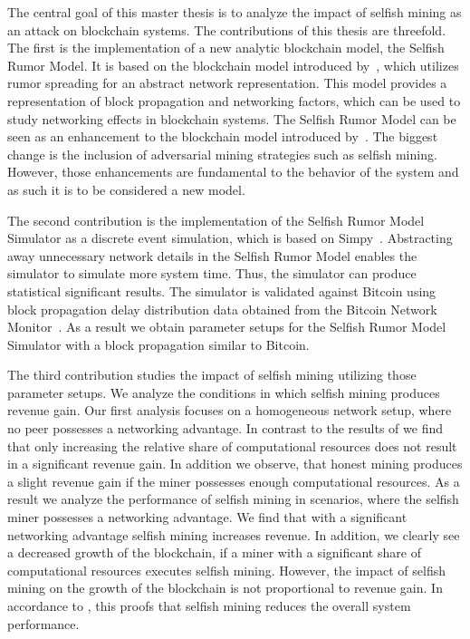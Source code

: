 The central goal of this master thesis is to analyze the impact of selfish mining as an attack on blockchain systems. The contributions of this thesis are threefold. The first is the implementation of a new analytic blockchain model, the Selfish Rumor Model. It is based on the blockchain model introduced by~, which utilizes rumor spreading for an abstract network representation. This model provides a representation of block propagation and networking factors, which can be used to study networking effects in blockchain systems. The Selfish Rumor Model can be seen as an enhancement to the blockchain model introduced by~. The biggest change is the inclusion of adversarial mining strategies such as selfish mining. However, those enhancements are fundamental to the behavior of the system and as such it is to be considered a new model.

The second contribution is the implementation of the Selfish Rumor Model Simulator as a discrete event simulation, which is based on Simpy~\cite{simpy}.
Abstracting away unnecessary network details in the Selfish Rumor Model enables the simulator to simulate more system time. Thus, the simulator can produce statistical significant results. The simulator is validated against Bitcoin using block propagation delay distribution data obtained from the Bitcoin Network Monitor~\cite{BitcoinNetworkMonitor}. As a result we obtain parameter setups for the Selfish Rumor Model Simulator with a block propagation similar to Bitcoin.

The third contribution studies the impact of selfish mining utilizing those parameter setups. We analyze the conditions in which selfish mining produces revenue gain. Our first analysis focuses on a homogeneous network setup, where no peer possesses a networking advantage. In contrast to the results of \citeauthor{eyal} we find that only increasing the relative share of computational resources does not result in a significant revenue gain. In addition we observe, that honest mining produces a slight revenue gain if the miner possesses enough computational resources.
As a result we analyze the performance of selfish mining in scenarios, where the selfish miner possesses a networking advantage. We find that with a significant networking advantage selfish mining increases revenue.
In addition, we clearly see a decreased growth of the blockchain, if a miner with a significant share of computational resources executes selfish mining. However, the impact of selfish mining on the growth of the blockchain is not proportional to revenue gain. In accordance to \citeauthor{eyal}, this proofs that selfish mining reduces the overall system performance.

